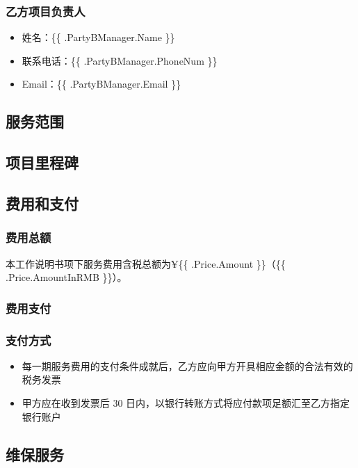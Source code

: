 \subsubsection{乙方项目负责人}
\begin{itemize}
  \item 姓名：\{\{ .PartyBManager.Name \}\}
  \item 联系电话：\{\{ .PartyBManager.PhoneNum \}\}
  \item Email：\{\{ .PartyBManager.Email \}\}
\end{itemize}

\clearpage

\subsection{服务范围}
\clearpage

\subsection{项目里程碑}
\clearpage

\subsection{费用和支付}

\subsubsection{费用总额}
本工作说明书项下服务费用含税总额为¥\{\{ .Price.Amount \}\}（\{\{ .Price.AmountInRMB \}\}）。

\subsubsection{费用支付}

\subsubsection{支付方式}
\begin{itemize}
  \item 每一期服务费用的支付条件成就后，乙方应向甲方开具相应金额的合法有效的税务发票
  \item 甲方应在收到发票后 30 日内，以银行转账方式将应付款项足额汇至乙方指定银行账户
\end{itemize}

\clearpage

\subsection{维保服务}

